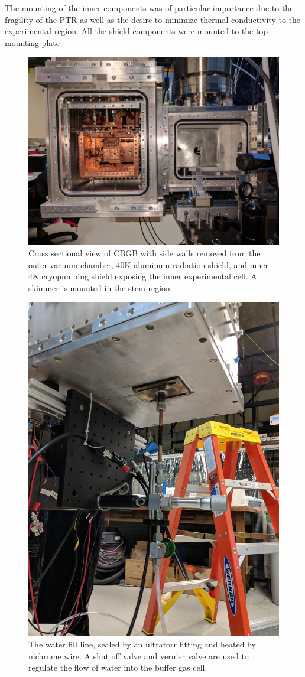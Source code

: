 The mounting of the inner components was of particular importance due to the fragility of the PTR as well as the desire to minimize thermal conductivity to the experimental region. All the shield components were mounted to the top mounting plate 


\begin{figure}[H]
	\centering
	\includegraphics[width=1\textwidth]{images/CBGB_cross_section.jpg}
	\caption{Cross sectional view of CBGB with side walls removed from the outer vacuum chamber, 40K aluminum radiation shield, and inner 4K cryopumping shield exposing the inner experimental cell. A skimmer is mounted in the stem region.}
	\label{fig: chamber}
\end{figure}

\begin{figure}[H]
	\centering
	\includegraphics[width=.7\textwidth]{images/CBGB_water_fill_outside.jpg}
	\caption{The water fill line, sealed by an ultratorr fitting and heated by nichrome wire. A shut off valve and vernier valve are used to regulate the flow of water into the buffer gas cell.}
	\label{fig: outside}
\end{figure}

